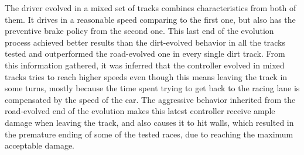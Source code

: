	The driver evolved in a mixed set of tracks combines characteristics from both of them. It drives in a reasonable speed comparing to the first one, but also has the preventive brake policy from the second one. This last end of the evolution process achieved better results than the dirt-evolved behavior in all the tracks tested and outperformed the road-evolved one in every single dirt track. From this information gathered, it was inferred that the controller evolved in mixed tracks tries to reach higher speeds even though this means leaving the track in some turns, mostly because the time spent trying to get back to the racing lane is compensated by the speed of the car. The aggressive behavior inherited from the road-evolved end of the evolution makes this latest controller receive ample damage when leaving the track, and also causes it to hit walls, which resulted in the premature ending of some of the tested races, due to reaching the maximum acceptable damage.
	
	
	